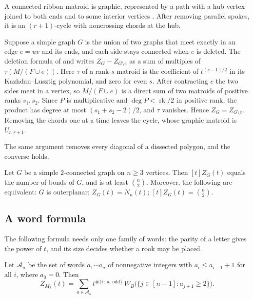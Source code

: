\begin{proof*}[Sketch]
A connected ribbon matroid is graphic, represented by a path with a hub vertex
joined to both ends and to some interior vertices
\cite{KnauerMartinezSandovalAlfonsin2018}.  After removing parallel spokes,
it is an $(r+1)$-cycle with noncrossing chords at the hub.

Suppose a simple graph $G$ is the union of two graphs that meet exactly in an
edge $e=uv$ and its ends, and each side stays connected when $e$ is deleted.
The deletion formula of  and 
\cite[Thm.~2.8]{BradenVysogorets2020} writes $Z_G-Z_{G\setminus e}$ as a sum of
multiples of $\tau(M/(F\cup e))$.  Here $\tau$ of a rank-$s$ matroid is the
coefficient of $t^{(s-1)/2}$ in its Kazhdan--Lusztig polynomial, and zero for
even $s$.  After contracting $e$ the two sides meet in a vertex, so
$M/(F\cup e)$ is a direct sum of two matroids of positive ranks $s_1,s_2$.
Since $P$ is multiplicative and $\deg P<\operatorname{rk}/2$ in positive rank,
the product has degree at most $(s_1+s_2-2)/2$, and $\tau$ vanishes.  Hence
$Z_G=Z_{G\setminus e}$.  Removing the chords one at a time leaves the cycle,
whose graphic matroid is $U_{r,r+1}$.
\end{proof*}

The same argument removes every diagonal of a dissected polygon, and the
converse holds.

\begin{theorem}
Let $G$ be a simple $2$-connected graph on $n\geq3$ vertices.  Then $[t]Z_G(t)$
equals the number of bonds of $G$, and is at least $\binom{n}{2}$.  Moreover,
the following are equivalent: $G$ is outerplanar; $Z_G(t)=N_n(t)$;
$[t]Z_G(t)=\binom{n}{2}$.
\end{theorem}


\subsection[schubertMatroidZWords]{A word formula}

The following formula needs only one family of words: the parity of a letter
gives the power of $t$, and its size decides whether a rook may be placed.

\begin{proposition}[Alexandersson, 2026]\label{schubertMatroidZWordFormula}
Let $\mathcal{A}_n$ be the set of words $a_1\dotsm a_n$ of nonnegative
integers with $a_i\leq a_{i-1}+1$ for all $i$, where $a_0=0$.  Then
\[
  Z_{M_\lambda}(t)=\sum_{a\in\mathcal{A}_n}
  t^{\#\{i\,:\,a_i\text{ odd}\}}\,
  W_B\bigl(\{j\in[n-1]:a_{j+1}\geq2\}\bigr).
\]
\end{proposition}

